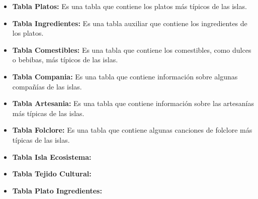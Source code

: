 \documentclass[11pt]{report}
\begin{document}
\begin{itemize}
            \newpage

      \item \textbf{Tabla Platos:} Es una tabla que contiene los platos más típicos de las islas.
            \lstset{style=mystyle}
            

      \item \textbf{Tabla Ingredientes:} Es una tabla auxiliar que contiene los ingredientes de los platos.
            \lstset{style=mystyle}
            

      \item \textbf{Tabla Comestibles:} Es una tabla que contiene los comestibles, como dulces o bebibas, más típicos de las islas.
            \lstset{style=mystyle}
            

      \item \textbf{Tabla Compania:} Es una tabla que contiene información sobre algunas compañías de las islas.
            \lstset{style=mystyle}
            

      \item \textbf{Tabla Artesania:} Es una tabla que contiene información sobre las artesanías más típicas de las islas.
            \lstset{style=mystyle}
            

      \item \textbf{Tabla Folclore:} Es una tabla que contiene algunas canciones de folclore más típicas de las islas.
            \lstset{style=mystyle}
            

            \newpage

      \item \textbf{Tabla Isla Ecosistema:}
            \lstset{style=mystyle}
            

      \item \textbf{Tabla Tejido Cultural:}
            \lstset{style=mystyle}
            

      \item \textbf{Tabla Plato Ingredientes:}
            \lstset{style=mystyle}
            


\end{itemize}
\end{document}
